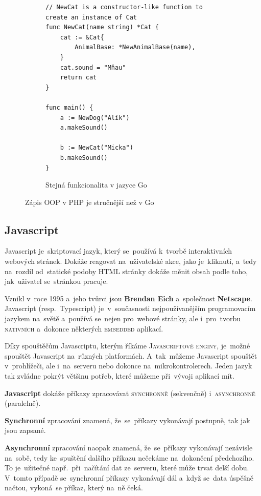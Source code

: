 \documentclass[14pt,a4paper]{article}
\begin{document}
\begin{figure}
\begin{subfigure}[b]{0.45\linewidth}
\begin{verbatim}
// NewCat is a constructor-like function to create an instance of Cat
func NewCat(name string) *Cat {
	cat := &Cat{
		AnimalBase: *NewAnimalBase(name),
	}
	cat.sound = "Mňau"
	return cat
}

func main() {
	a := NewDog("Alík")
	a.makeSound()

	b := NewCat("Micka")
	b.makeSound()
}
                \end{verbatim}
                \label{oop:golang}
                \caption{Stejná funkcionalita v jazyce Go}
            \end{subfigure}
            \label{oop:difference}
            \caption{Zápis OOP v PHP je stručnější než v Go}
        \end{figure}

        \subsection{Javascript}
        Javascript je~skriptovací jazyk, který se~používá k~tvorbě interaktivních webových stránek. Dokáže reagovat na~uživatelské akce, jako je~kliknutí, a~tedy na~rozdíl od~statické podoby HTML stránky dokáže měnit obsah podle toho, jak~uživatel se~stránkou pracuje.

        Vznikl v~roce 1995 a~jeho tvůrci jsou \textbf{Brendan Eich} a~společnost \textbf{Netscape}. Javascript (resp.~Typescript) je~v~současnosti nejpoužívanějším programovacím jazykem na~světě a~používá se~nejen pro~webové stránky, ale i~pro~tvorbu \textsc{nativních} a~dokonce některých \textsc{embedded} aplikací.

        Díky spouštěčům Javascriptu, kterým říkáme \textsc{Javascriptové enginy}, je~možné spouštět Javascript na~různých platformách. A~tak~můžeme Javascript spouštět v~prohlížeči, ale i~na~serveru nebo dokonce na~mikrokontrolerech. Jeden jazyk tak zvládne pokrýt většinu potřeb, které můžeme při~vývoji aplikací mít.

        \textbf{Javascript} dokáže příkazy zpracovávat \textsc{synchronně} (sekvenčně) i~\textsc{asynchronně} (paralelně).
        
        \textbf{Synchronní} zpracování znamená, že~se~příkazy vykonávají postupně, tak jak
        jsou zapsané.
        
        \textbf{Asynchronní} zpracování naopak znamená, že~se~příkazy vykonávají nezávisle na~sobě, tedy ke~spuštění dalšího příkazu nečekáme na~dokončení předchozího. To je~užitečné např.~při~načítání dat ze~serveru,
        které může trvat delší dobu. V~tomto případě se~synchronní příkazy vykonávají dál a~když se~data úspěšně načtou, vykoná~se příkaz, který na~ně čeká. \parencite{kantor_javascript}
\end{document}
